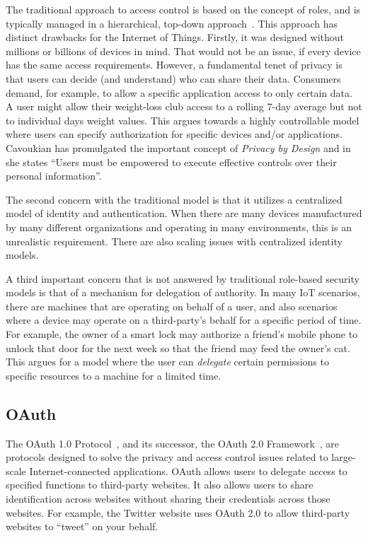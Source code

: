 \documentclass{IEEEtran}
\begin{document}
The traditional approach to access control is based on the concept of roles, and is typically
managed in a hierarchical, top-down approach~\cite{sandhu1994access}.
This approach has distinct drawbacks for the Internet of Things. Firstly, it was designed 
without millions or billions of devices in mind. That would not be an issue, if every device has the same 
access requirements. However, a fundamental tenet of privacy is that users can decide (and understand) who can
share their data. Consumers demand, for example, to allow a specific application 
access to only certain data. A user might allow their weight-loss club access to a rolling 7-day
average but not to individual days weight values. This argues towards a highly controllable model where users
can specify authorization for specific devices and/or applications. Cavoukian has promulgated
the important concept of \emph{Privacy by Design} and in~\cite{cavoukian2008privacy} she
states ``Users must be empowered to execute effective controls over their personal information''.

The second concern with the traditional model is that it utilizes a centralized model of identity and authentication.
 When there are many devices manufactured by many different organizations and operating in many environments, this is an unrealistic 
requirement. There are also scaling issues with centralized identity models.

A third important concern that is not answered by traditional role-based security models is that of a mechanism for delegation of authority.
In many IoT scenarios, there are machines that are operating on behalf of a user, and also scenarios where a device may operate on a third-party's
behalf for a specific period of time. For example, the owner of a smart lock may authorize a friend's mobile phone to unlock that door
for the next week so that the friend may feed the owner's cat. This argues for a model where the user can \emph{delegate} certain permissions to specific resources to a machine for 
a limited time. 
\subsection{OAuth}
The OAuth 1.0 Protocol~\cite{rfc5849}, and its successor,
the OAuth 2.0 Framework~\cite{rfc6749}, are protocols
designed to solve the privacy and access control issues related to large-scale Internet-connected applications.
OAuth allows 
users to delegate access to specified functions to third-party websites. It also allows users to 
share identification across websites without sharing their credentials across those websites. 
For example, the Twitter website uses OAuth 2.0 to allow third-party websites to ``tweet'' 
on your behalf.
\end{document}
